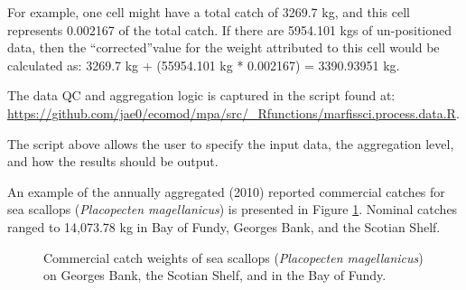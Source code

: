 \documentclass[letterpaper,portrait,11pt]{scrartcl}
\numberwithin{equation}{section}		%
\numberwithin{figure}{section}		%
\numberwithin{table}{section}				%
\newcommand{\ecomod}{\string~/ecomod_data/}   %
\newcommand{\sab}{\ecomod/mpa/sab/}   %
\begin{document}
For example, one cell might have a total catch of 3269.7 kg, and this cell represents 0.002167 of the total catch.  If there are 5954.101 kgs of un-positioned data, then the \textquotedblleft corrected\textquotedblright value for the weight attributed to this cell would be calculated as:
3269.7 kg + (55954.101 kg * 0.002167) = 3390.93951 kg.


The data QC and aggregation logic is captured in the script found at:
\url{https://github.com/jae0/ecomod/mpa/src/\_Rfunctions/marfissci.process.data.R}.

The script above allows the user to specify the input data, the aggregation level, and how the results should be output.

An example of the annually aggregated (2010) reported commercial catches for sea scallops (\textit{Placopecten magellanicus}) is presented in Figure \ref{fig:Scallop}. Nominal catches ranged to 14,073.78  kg in Bay of Fundy, Georges Bank, and the Scotian Shelf.











\begin{figure}[h]
	\label{fig:Scallop}
	\centering
	\caption{Commercial catch weights of sea scallops (\textit{Placopecten magellanicus}) on Georges Bank, the Scotian Shelf, and in the Bay of Fundy.}
\end{figure}
\end{document}
